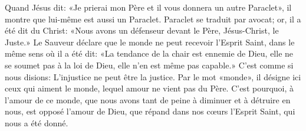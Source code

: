 Quand Jésus dit: «Je prierai mon Père et il vous donnera un autre Paraclet»,
	il montre que lui-même est aussi un Paraclet.
Paraclet se traduit par avocat; or, il a été dit du Christ:
	«Nous avons un défenseur devant le Père, Jésus-Christ, le Juste.»
Le Sauveur déclare que le monde ne peut recevoir l’Esprit Saint,
	dans le même sens où il a été dit:
	«La tendance de la chair est ennemie de Dieu,
	elle ne se soumet pas à la loi de Dieu, elle n’en est même pas capable.»
C’est comme si nous disions:
	L’injustice ne peut être la justice.
Par le mot «monde», il désigne ici ceux qui aiment le monde,
	lequel amour ne vient pas du Père.
C’est pourquoi, à l’amour de ce monde,
	que nous avons tant de peine à diminuer et à détruire en nous,
	est opposé l’amour de Dieu,
	que répand dans nos cœurs l’Esprit Saint, qui nous a été donné.

